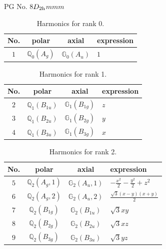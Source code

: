 \documentclass[fleqn,8pt,landscape]{jsarticle}
\begin{document}
\setcounter{MaxMatrixCols}{32}

\renewcommand{\tablename}{Table~}
\renewcommand{\figurename}{Figure~}
\begin{center}
\LARGE
PG No. 8\quad$D_{\rm 2h}$\quad$mmm$\quad[ orthorhombic ]
\end{center}
\begin{table}[ht!]
\begin{center}
\caption{Harmonics for rank 0.}
\renewcommand{\arraystretch}{1.3}
\begin{tabular}{cccl} \hline \hline
No. & polar & axial & expression \\ \hline
$ 1 $ & $ \mathbb{Q}_{0}(A_{g}) $ & $ \mathbb{G}_{0}(A_{u}) $ & $ 1 $ \\
 \hline \hline
\end{tabular}
\end{center}
\end{table}
\begin{table}[ht!]
\begin{center}
\caption{Harmonics for rank 1.}
\renewcommand{\arraystretch}{1.3}
\begin{tabular}{cccl} \hline \hline
No. & polar & axial & expression \\ \hline
$ 2 $ & $ \mathbb{Q}_{1}(B_{1u}) $ & $ \mathbb{G}_{1}(B_{1g}) $ & $ z $ \\
$ 3 $ & $ \mathbb{Q}_{1}(B_{2u}) $ & $ \mathbb{G}_{1}(B_{2g}) $ & $ y $ \\
$ 4 $ & $ \mathbb{Q}_{1}(B_{3u}) $ & $ \mathbb{G}_{1}(B_{3g}) $ & $ x $ \\
 \hline \hline
\end{tabular}
\end{center}
\end{table}
\begin{table}[ht!]
\begin{center}
\caption{Harmonics for rank 2.}
\renewcommand{\arraystretch}{1.3}
\begin{tabular}{cccl} \hline \hline
No. & polar & axial & expression \\ \hline
$ 5 $ & $ \mathbb{Q}_{2}(A_{g},1) $ & $ \mathbb{G}_{2}(A_{u},1) $ & $ - \frac{x^{2}}{2} - \frac{y^{2}}{2} + z^{2} $ \\
$ 6 $ & $ \mathbb{Q}_{2}(A_{g},2) $ & $ \mathbb{G}_{2}(A_{u},2) $ & $ \frac{\sqrt{3} \left(x - y\right) \left(x + y\right)}{2} $ \\
$ 7 $ & $ \mathbb{Q}_{2}(B_{1g}) $ & $ \mathbb{G}_{2}(B_{1u}) $ & $ \sqrt{3} x y $ \\
$ 8 $ & $ \mathbb{Q}_{2}(B_{2g}) $ & $ \mathbb{G}_{2}(B_{2u}) $ & $ \sqrt{3} x z $ \\
$ 9 $ & $ \mathbb{Q}_{2}(B_{3g}) $ & $ \mathbb{G}_{2}(B_{3u}) $ & $ \sqrt{3} y z $ \\
 \hline \hline
\end{tabular}
\end{center}
\end{table}
\end{document}
